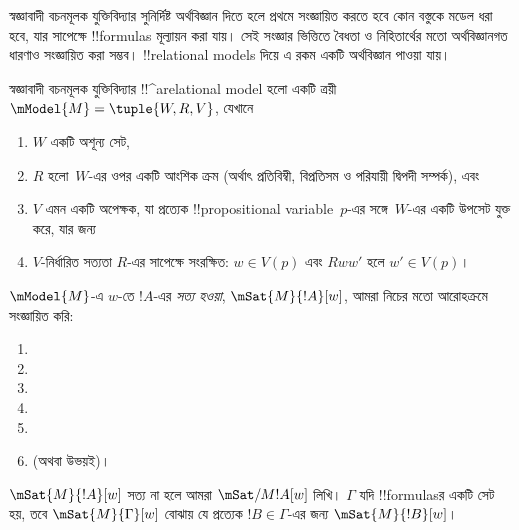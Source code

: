\documentclass[../../../include/open-logic-section]{subfiles}
\begin{document}


স্বজ্ঞাবাদী বচনমূলক যুক্তিবিদ্যার সুনির্দিষ্ট অর্থবিজ্ঞান দিতে হলে
প্রথমে সংজ্ঞায়িত করতে হবে কোন বস্তুকে মডেল ধরা হবে, যার সাপেক্ষে
!!{formula}s মূল্যায়ন করা যায়। সেই সংজ্ঞার ভিত্তিতে বৈধতা ও
নিহিতার্থের মতো অর্থবিজ্ঞানগত ধারণাও সংজ্ঞায়িত করা সম্ভব।
!!{relational model}s দিয়ে এ রকম একটি অর্থবিজ্ঞান পাওয়া যায়।

\begin{defn}
  স্বজ্ঞাবাদী বচনমূলক যুক্তিবিদ্যার !!^a{relational model} হলো
  একটি ত্রয়ী $\mModel{M} = \tuple{W, R, V}$, যেখানে
  \begin{enumerate}
  \item $W$ একটি অশূন্য সেট,
  \item $R$ হলো~$W$-এর ওপর একটি আংশিক ক্রম (অর্থাৎ প্রতিবিম্বী,
    বিপ্রতিসম ও পরিযায়ী দ্বিপদী সম্পর্ক), এবং
  \item $V$ এমন একটি অপেক্ষক, যা প্রত্যেক !!{propositional
    variable}~$p$-এর সঙ্গে~$W$-এর একটি উপসেট যুক্ত করে, যার জন্য
  \item $V$-নির্ধারিত সত্যতা $R$-এর সাপেক্ষে সংরক্ষিত: $w \in V(p)$ এবং
    $Rww'$ হলে $w' \in V(p)$।
  \end{enumerate}
\end{defn}

\begin{defn}
  $\mModel{M}$-এ $w$-তে $!A$-এর \emph{সত্য হওয়া},
  $\mSat{M}{!A}[w]$, আমরা নিচের মতো আরোহক্রমে সংজ্ঞায়িত করি:
  \begin{enumerate}
  \item {}
  \item {}
  \item {}
  \item {}
  \item {}
  \item {}
    (অথবা উভয়ই)।
  \end{enumerate}
  $\mSat{M}{!A}[w]$ সত্য না হলে আমরা $\mSat/{M}{!A}[w]$ লিখি।
  $\Gamma$ যদি !!{formula}sর একটি সেট হয়, তবে
  $\mSat{M}{\Gamma}[w]$ বোঝায় যে প্রত্যেক $!B \in \Gamma$-এর
  জন্য $\mSat{M}{!B}[w]$।
\end{defn}
\end{document}

